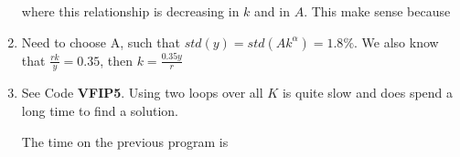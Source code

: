 \documentclass[12pt]{article}%
\begin{document}
\begin{enumerate}
	where this relationship is decreasing in $k$ and in $A$. This make sense because 

	
	\item Need to choose A, such that $std(y)=std(Ak^\alpha)=1.8\%$. We also know that $\frac{rk}{y}=0.35$, then $k=\frac{0.35y}{r} $
	
	\item See Code \textbf{VFIP5}. Using two loops over all $K$ is quite slow and does spend a long time to find a solution. 
	
	The time on the previous program is 
	
\end{enumerate}

\strut

\onehalfspacing
\end{document}
